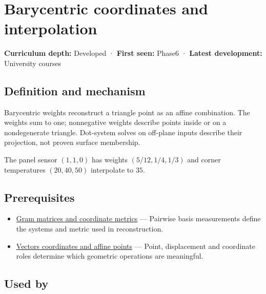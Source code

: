 \hypertarget{appendix-02b9d9a81dca}{}\label{referencestart:appendix-02b9d9a81dca}
\section{Barycentric coordinates and interpolation}\label{appendix-02b9d9a81dca-barycentric-coordinates-and-interpolation}

\textbf{Curriculum depth:} Developed · \textbf{First seen:} Phase6 · \textbf{Latest development:} University courses

\subsection{Definition and mechanism}\label{appendix-02b9d9a81dca-definition-and-mechanism}

Barycentric weights reconstruct a triangle point as an affine combination. The weights sum to one; nonnegative weights describe points inside or on a nondegenerate triangle. Dot-system solves on off-plane inputs describe their projection, not proven surface membership.

The panel sensor \((1,1,0)\) has weights \((5/12,1/4,1/3)\) and corner temperatures \((20,40,50)\) interpolate to \(35\).

\subsection{Prerequisites}\label{appendix-02b9d9a81dca-prerequisites}

\begin{itemize}
\tightlist
\item
  \hyperref[appendix-3b863809f82a]{Gram matrices and coordinate metrics} --- Pairwise basis measurements define the systems and metric used in reconstruction.
\item
  \hyperref[appendix-0659864c0aa3]{Vectors coordinates and affine points} --- Point, displacement and coordinate roles determine which geometric operations are meaningful.
\end{itemize}

\subsection{Used by}\label{appendix-02b9d9a81dca-used-by}

